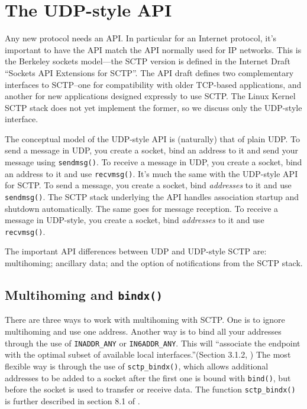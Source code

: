 \documentclass[twocolumn]{article}
\begin{document}
\section{The UDP-style API}

Any new protocol needs an API.  In particular for an Internet
protocol, it's important to have the API match the API normally used
for IP networks.  This is the Berkeley sockets model---the SCTP
version is defined in the Internet Draft ``Sockets API Extensions for
SCTP''\cite{api}.  The API draft defines two complementary interfaces
to SCTP--one for compatibility with older TCP-based applications, and
another for new applications designed expressly to use SCTP.  The
Linux Kernel SCTP stack does not yet implement the former, so we
discuss only the UDP-style interface.

The conceptual model of the UDP-style API is (naturally) that of plain
UDP.  To send a message in UDP, you create a socket, bind an address
to it and send your message using \texttt{sendmsg()}. To receive a
message in UDP, you create a socket, bind an address to it and use
\texttt{recvmsg()}.  It's much the same with the UDP-style API for
SCTP.  To send a message, you create a socket, bind \textit{addresses}
to it and use \texttt{sendmsg()}.  The SCTP stack underlying the API
handles association startup and shutdown automatically.  The same goes
for message reception.  To receive a message in UDP-style, you create
a socket, bind \textit{addresses} to it and use \texttt{recvmsg()}.

The important API differences between UDP and UDP-style SCTP are:
multihoming; ancillary data; and the option of notifications from the
SCTP stack.

\subsection{Multihoming and \texttt{bindx()}}

There are three ways to work with multihoming with SCTP.  One is to
ignore multihoming and use one address.  Another way is to bind all
your addresses through the use of \texttt{INADDR\_ANY} or
\texttt{IN6ADDR\_ANY}.  This will ``associate the endpoint with the
optimal subset of available local interfaces.''(Section 3.1.2,
\cite{api})  The most flexible way is through the use of
\texttt{sctp\_bindx()}, which allows additional addresses to be
added to a socket after the first one is bound with \texttt{bind()},
but before the socket is used to transfer or receive data.  The
function \texttt{sctp\_bindx()} is further described in section 8.1 of
\cite{api}.
\end{document}
